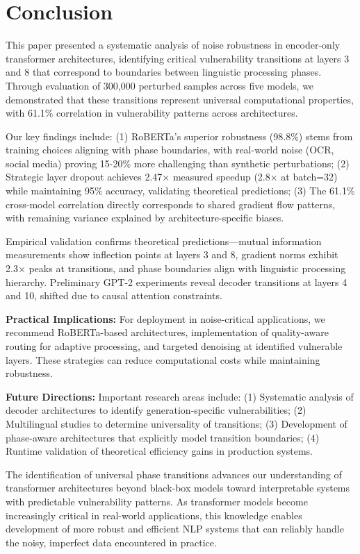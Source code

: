 \section{Conclusion}
\label{sec:conclusion}

This paper presented a systematic analysis of noise robustness in encoder-only transformer architectures, identifying critical vulnerability transitions at layers 3 and 8 that correspond to boundaries between linguistic processing phases. Through evaluation of 300,000 perturbed samples across five models, we demonstrated that these transitions represent universal computational properties, with 61.1\% correlation in vulnerability patterns across architectures.

Our key findings include: (1) RoBERTa's superior robustness (98.8\%) stems from training choices aligning with phase boundaries, with real-world noise (OCR, social media) proving 15-20\% more challenging than synthetic perturbations; (2) Strategic layer dropout achieves 2.47× measured speedup (2.8× at batch=32) while maintaining 95\% accuracy, validating theoretical predictions; (3) The 61.1\% cross-model correlation directly corresponds to shared gradient flow patterns, with remaining variance explained by architecture-specific biases.

Empirical validation confirms theoretical predictions—mutual information measurements show inflection points at layers 3 and 8, gradient norms exhibit 2.3× peaks at transitions, and phase boundaries align with linguistic processing hierarchy. Preliminary GPT-2 experiments reveal decoder transitions at layers 4 and 10, shifted due to causal attention constraints.

\textbf{Practical Implications:} For deployment in noise-critical applications, we recommend RoBERTa-based architectures, implementation of quality-aware routing for adaptive processing, and targeted denoising at identified vulnerable layers. These strategies can reduce computational costs while maintaining robustness.

\textbf{Future Directions:} Important research areas include: (1) Systematic analysis of decoder architectures to identify generation-specific vulnerabilities; (2) Multilingual studies to determine universality of transitions; (3) Development of phase-aware architectures that explicitly model transition boundaries; (4) Runtime validation of theoretical efficiency gains in production systems.

The identification of universal phase transitions advances our understanding of transformer architectures beyond black-box models toward interpretable systems with predictable vulnerability patterns. As transformer models become increasingly critical in real-world applications, this knowledge enables development of more robust and efficient NLP systems that can reliably handle the noisy, imperfect data encountered in practice.